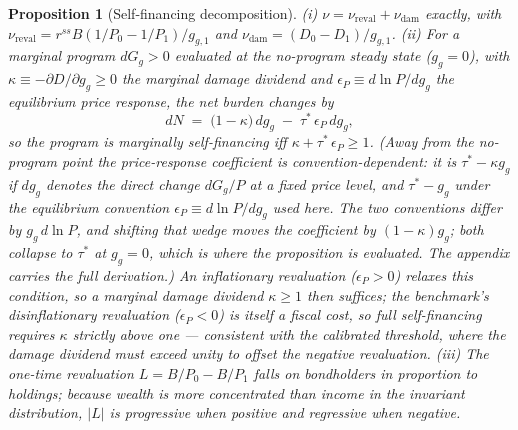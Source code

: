 \documentclass[12pt]{article}
\newtheorem{proposition}{Proposition}
\begin{document}
\begin{proposition}[Self-financing decomposition]\label{prop:selffinancing}
(i) $\nu=\nu_{\mathrm{reval}}+\nu_{\mathrm{dam}}$ exactly, with
$\nu_{\mathrm{reval}} = r^{ss}B(1/P_0-1/P_1)/g_{g,1}$ and
$\nu_{\mathrm{dam}}=(D_0-D_1)/g_{g,1}$.
(ii) For a marginal program $dG_g>0$ evaluated \emph{at} the no-program steady
state ($g_g=0$), with
$\kappa \equiv -\partial D/\partial g_g \ge 0$ the marginal damage dividend
and $\epsilon_P \equiv d\ln P/dg_g$ the equilibrium price response, the net
burden changes by
\begin{equation}
dN \;=\; \big(1-\kappa\big)\,dg_g \;-\;
\tau^{*}\,\epsilon_P\, dg_g ,
\label{eq:marginal}
\end{equation}
so the program is marginally self-financing iff
$\kappa + \tau^{*}\,\epsilon_P \ge 1$. (Away from the no-program point the
price-response coefficient is convention-dependent: it is $\tau^{*}-\kappa g_g$
if $dg_g$ denotes the \emph{direct} change $dG_g/P$ at a fixed price level, and
$\tau^{*}-g_g$ under the equilibrium convention $\epsilon_P\equiv d\ln P/dg_g$
used here. The two \emph{conventions} differ by $g_g\,d\ln P$, and shifting that
wedge moves the coefficient by $(1-\kappa)g_g$; both collapse to $\tau^{*}$ at
$g_g=0$, which is where the proposition is evaluated. The appendix carries the
full derivation.)
An inflationary
revaluation ($\epsilon_P>0$) relaxes this condition, so a marginal damage
dividend $\kappa\ge1$ then suffices; the benchmark's \emph{disinflationary}
revaluation ($\epsilon_P<0$) is itself a fiscal cost, so full self-financing
requires $\kappa$ strictly above one --- consistent with the calibrated
threshold, where the damage dividend must exceed unity to offset the
negative revaluation.
(iii) The one-time revaluation $L=B/P_0-B/P_1$ falls on bondholders in
proportion to holdings; because wealth is more concentrated than income in
the invariant distribution, $|L|$ is progressive when positive and regressive
when negative.
\end{proposition}
\end{document}
